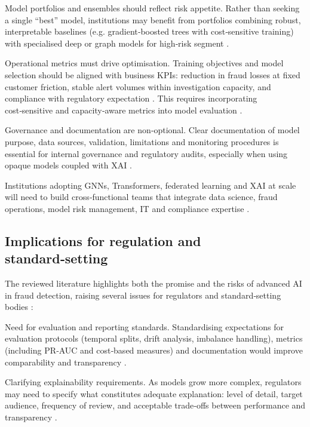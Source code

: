 \documentclass[a4paper,fleqn]{cas-dc}
\begin{document}
Model portfolios and ensembles should reflect risk appetite. 
Rather than seeking a single “best” model, institutions may benefit from portfolios combining robust, interpretable baselines (e.g. gradient‑boosted trees with cost‑sensitive training) with specialised deep or graph models for high‑risk segment \cite{zhao_improved_2024, ileberi_hybrid_2024, han_enhanced_2025}.

Operational metrics must drive optimisation. 
Training objectives and model selection should be aligned with business KPIs: reduction in fraud losses at fixed customer friction, stable alert volumes within investigation capacity, and compliance with regulatory expectation \cite{leevy_threshold_2023, mill_opportunities_2023}. 
This requires incorporating cost‑sensitive and capacity‑aware metrics into model evaluation \cite{zhao_improved_2024}.

Governance and documentation are non‑optional. 
Clear documentation of model purpose, data sources, validation, limitations and monitoring procedures is essential for internal governance and regulatory audits, especially when using opaque models coupled with XAI \cite{parkar_comparative_2024, mill_opportunities_2023, sarna_ai_2025}.

Institutions adopting GNNs, Transformers, federated learning and XAI at scale will need to build cross‑functional teams that integrate data science, fraud operations, model risk management, IT and compliance expertise \cite{baabdullah_efficiency_2024, alarfaj_enhancing_2025, sarna_ai_2025}.

\subsection{Implications for regulation and standard‑setting}

The reviewed literature highlights both the promise and the risks of advanced AI in fraud detection, raising several issues for regulators and standard‑setting bodies \cite{sarna_ai_2025}:

Need for evaluation and reporting standards. 
Standardising expectations for evaluation protocols (temporal splits, drift analysis, imbalance handling), metrics (including PR‑AUC and cost‑based measures) and documentation would improve comparability and transparency \cite{cherif_credit_2023, leevy_threshold_2023, mienye_deep_2024}.

Clarifying explainability requirements. 
As models grow more complex, regulators may need to specify what constitutes adequate explanation: 
level of detail, target audience, frequency of review, and acceptable trade‑offs between performance and transparency \cite{mill_opportunities_2023, parkar_comparative_2024}.
\end{document}
